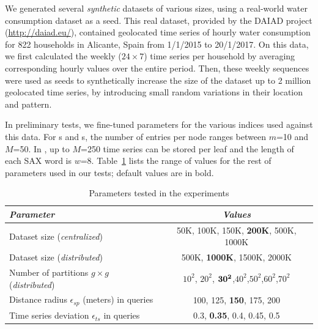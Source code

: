 
We generated several {\em synthetic} datasets of various sizes, using a real-world water consumption dataset as a seed. This real dataset, provided by the DAIAD project (\url{http://daiad.eu/}), contained geolocated time series of hourly water consumption for 822 households in Alicante, Spain from 1/1/2015 to 20/1/2017. On this data, we first calculated the weekly  ($24 \times 7$) time series per household by averaging corresponding hourly values over the entire period. Then, these weekly sequences were used as seeds to synthetically increase the size of the dataset up to 2 million geolocated time series, by introducing small random variations in their location and pattern.



In preliminary tests, we fine-tuned parameters for the various indices used against this data. For {\btsr}s and {\rtree}s, the number of entries per node ranges between $m$=10 and $M$=50. 
In \isax, up to $M$=250 time series can be stored per leaf and the length of each SAX word is $w$=8. Table~\ref{tab:parameters} lists the range of values for the rest of parameters used in our tests; default values are in bold. 




\begin{table}[t]
\centering
\caption{Parameters tested in the experiments}
 \vspace{-10pt}
\begin{footnotesize}
\begin{tabular}{lc} 
\hline
{\em Parameter} &{\em Values} \\
\hline
Dataset size ({\em centralized}) & 50K, 100K, 150K, {\bf 200K}, 500K, 1000K \\
Dataset size ({\em distributed}) & 500K, {\bf 1000K}, 1500K, 2000K \\
Number of partitions $g\times g$ ({\em distributed}) & $10^2$, $20^2$, ${\bf 30^2}$,$40^2$,$50^2$,$60^2$,$70^2$ \\
Distance radius $\epsilon_{sp}$ (meters) in queries & 100, 125, {\bf 150}, 175, 200 \\
Time series deviation $\epsilon_{ts}$ in queries & 0.3, {\bf 0.35}, 0.4, 0.45, 0.5 \\
\hline
\end{tabular}
\end{footnotesize}
\label{tab:parameters}
\end{table}



